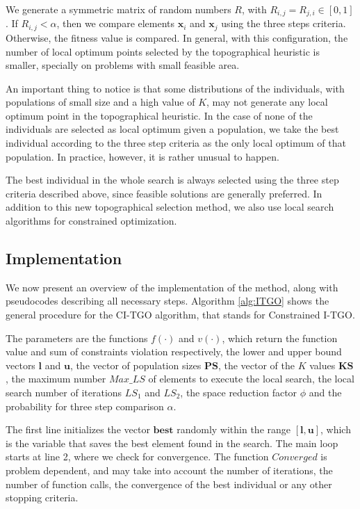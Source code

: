 We generate a symmetric matrix of random numbers $R$, with $R_{i, j} = R_{j, i} \in [0, 1]$. If $R_{i, j} < \alpha$, then we compare elements $\bm{x}_i$ and $\bm{x}_j$ using the three steps criteria. Otherwise, the fitness value is compared. In general, with this configuration, the number of local optimum points selected by the topographical heuristic is smaller, specially on problems with small feasible area. 

An important thing to notice is that some distributions of the individuals, with populations of small size and a high value of $K$, may not generate any local optimum point in the topographical heuristic. In the case of none of the individuals are selected as local optimum given a population, we take the best individual according to the three step criteria as the only local optimum of that population. In practice, however, it is rather unusual to happen.

The best individual in the whole search is always selected using the three step criteria described above, since  feasible solutions are generally preferred. In addition to this new topographical selection method, we also use local search algorithms for constrained optimization.


\subsection{Implementation}

We now present an overview of the implementation of the method, along with pseudocodes describing all necessary steps. Algorithm \ref{alg:ITGO} shows the general procedure for the CI-TGO algorithm, that stands for Constrained I-TGO. 

The parameters are the functions $f(\cdot)$ and $v(\cdot)$, which return the function value and sum of constraints violation respectively, the lower and upper bound vectors $\bm{l}$ and $\bm{u}$, the vector of population sizes $\bm{PS}$, the vector of the $K$ values $\bm{KS}$, the maximum number $Max\_LS$ of elements to execute the local search, the local search number of iterations $LS_1$ and $LS_2$, the space reduction factor $\phi$ and the probability for three step comparison $\alpha$.






The first line initializes the vector $\bm{best}$ randomly within the range $[\bm{l}, \bm{u}]$, which is the variable that saves the best element found in the search. The main loop starts at line 2, where we check for convergence. The function $Converged$ is problem dependent, and may take into account the number of iterations, the number of function calls, the convergence of the best individual or any other stopping criteria.

